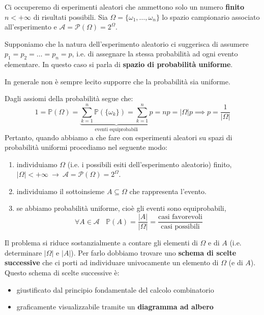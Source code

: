 
\ParteEsercizi

Ci occuperemo di esperimenti aleatori che ammettono solo un numero \textbf{finito} $n< +\infty $ di risultati possibili. Sia $\Omega =\{\omega _{1} ,\dots ,\omega _{n}\}$ lo spazio campionario associato all'esperimento e $\mathcal{A} =\mathcal{P}( \Omega ) =2^{\Omega }$.

Supponiamo che la natura dell'esperimento aleatorio ci suggerisca di assumere $p_{1} =p_{2} =\dots =p_{n} =p$, i.e. di assegnare la stessa probabilità ad ogni evento elementare. In questo caso si parla di \textbf{spazio di probabilità uniforme}.
\begin{oss}
In generale non è sempre lecito supporre che la probabilità sia uniforme.
\end{oss}
Dagli assiomi della probabilità segue che:
\begin{equation*}
1=\mathbb{P}( \Omega ) =\underbrace{\sum\limits _{k=1}^{n}\mathbb{P}(\{\omega _{k}\}) =\sum\limits _{k=1}^{n} p}_{\text{eventi equiprobabili}} =np=| \Omega | p\implies \boxed{p=\frac{1}{| \Omega | }}
\end{equation*}
Pertanto, quando abbiamo a che fare con esperimenti aleatori su spazi di probabilità uniformi procediamo nel seguente modo:
\begin{enumerate}
\item individuiamo $\Omega $ (i.e. i possibili esiti dell'esperimento aleatorio) finito, $| \Omega | < +\infty \ \rightarrow \ \mathcal{A} =\mathcal{P}( \Omega ) =2^{\Omega }$.
\item individuiamo il sottoinsieme $A\subseteq \Omega $ che rappresenta l'evento.
\item se abbiamo probabilità uniforme, cioè gli eventi sono equiprobabili,\begin{equation*}
\boxed{\forall A\in \mathcal{A} \ \ \ \ \mathbb{P}( A) =\frac{| A| }{| \Omega | } =\frac{\text{casi favorevoli}}{\text{casi possibili}}}
\end{equation*}
\end{enumerate}

Il problema si riduce sostanzialmente a contare gli elementi di $\Omega $ e di $A$ (i.e. determinare $| \Omega | $ e $| A| $). Per farlo dobbiamo trovare uno \textbf{schema di scelte successive} che ci porti ad individuare univocamente un elemento di $\Omega $ (e di $A$). Questo schema di scelte successive è:
\begin{itemize}
\item giustificato dal principio fondamentale del calcolo combinatorio
\item graficamente visualizzabile tramite un \textbf{diagramma ad albero}
\end{itemize}

